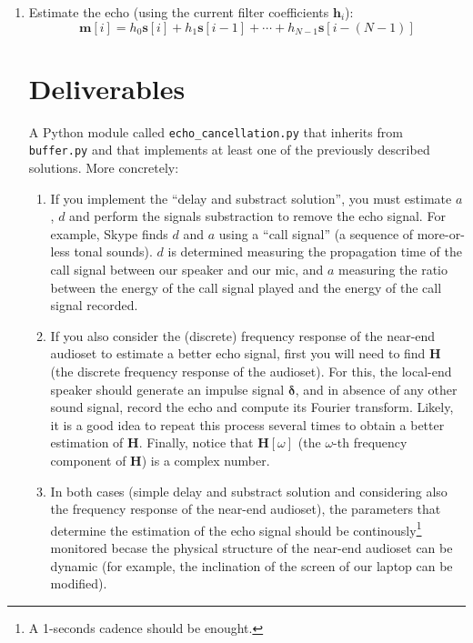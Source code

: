 \begin{enumerate}
\item Estimate the echo (using the current filter coefficients ${\mathbf h}_i$):
  \begin{equation}
    {\mathbf m}[i] = h_0{\mathbf s}[i] + h_1{\mathbf s}[i-1] + \cdots + h_{N-1}{\mathbf s}[i-(N-1)]
  \end{equation}

\section{Deliverables}

A Python module called \texttt{echo\_cancellation.py} that inherits from
\texttt{buffer.py} and that implements at least one of the previously
described solutions. More concretely:
\begin{enumerate}
\item If you implement the ``delay and substract solution'', you must
  estimate $a$, $d$ and perform the signals substraction to remove the
  echo signal. For example, Skype finds $d$ and $a$ using a ``call
  signal'' (a sequence of more-or-less tonal sounds). $d$ is
  determined measuring the propagation time of the call signal between
  our speaker and our mic, and $a$ measuring the ratio between the
  energy of the call signal played and the energy of the call signal
  recorded.
\item If you also consider the (discrete) frequency response of the
  near-end audioset to estimate a better echo signal, first you will
  need to find ${\mathbf H}$ (the discrete frequency response of the
  audioset). For this, the local-end speaker should generate an
  impulse signal ${\mathbf \delta}$, and in absence of any other sound
  signal, record the echo and compute its Fourier transform. Likely,
  it is a good idea to repeat this process several times to obtain a
  better estimation of ${\mathbf H}$. Finally, notice that
  ${\mathbf H}[\omega]$ (the $\omega$-th frequency component of
  ${\mathbf H}$) is a complex number.
\item In both cases (simple delay and substract solution and
  considering also the frequency response of the near-end audioset),
  the parameters that determine the estimation of the echo signal
  should be continously\footnote{A 1-seconds cadence should be
    enought.} monitored becase the physical structure of the near-end
  audioset can be dynamic (for example, the inclination of the screen
  of our laptop can be modified).


\end{enumerate}
\end{enumerate}

